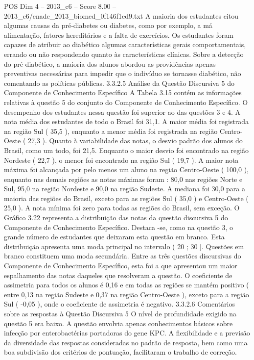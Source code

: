 \begin{textsample}{POS Dim 4 – 2013\_c6 – Score 8.00 – 2013\_c6/enade\_2013\_biomed\_0f146f1ed9.txt}
A maioria dos estudantes citou algumas causas da pré-diabetes ou diabetes, como por exemplo, a má alimentação, fatores hereditários e a falta de exercícios.
Os estudantes foram capazes de atribuir ao diabético algumas características gerais comportamentais, errando ou não respondendo quanto às características clínicas.
Sobre a detecção do pré-diabético, a maioria dos alunos abordou as providências apenas preventivas necessárias para impedir que o indivíduo se tornasse diabético, não comentando as políticas públicas. 3.3.2.5 Análise da Questão Discursiva 5 do Componente de Conhecimento Específico A Tabela 3.15 contém as informações relativas à questão 5 do conjunto do Componente de Conhecimento Específico.
O desempenho dos estudantes nessa questão foi superior ao das questões 3 e 4.
A nota média dos estudantes de todo o Brasil foi 31,1.
A maior média foi registrada na região Sul ( 35,5 ), enquanto a menor média foi registrada na região Centro-Oeste ( 27,3 ).
Quanto à variabilidade das notas, o desvio padrão dos alunos do Brasil, como um todo, foi 21,5.
Enquanto o maior desvio foi encontrado na região Nordeste ( 22,7 ), o menor foi encontrado na região Sul ( 19,7 ).
A maior nota máxima foi alcançada por pelo menos um aluno na região Centro-Oeste ( 100,0 ), enquanto nas demais regiões as notas máximas foram : 80,0 nas regiões Norte e Sul, 95,0 na região Nordeste e 90,0 na região Sudeste.
A mediana foi 30,0 para a maioria das regiões do Brasil, exceto para as regiões Sul ( 35,0 ) e Centro-Oeste ( 25,0 ).
A nota mínima foi zero para todas as regiões do Brasil, sem exceção.
O Gráfico 3.22 representa a distribuição das notas da questão discursiva 5 do Componente de Conhecimento Específico.
Destaca -se, como na questão 3, o grande número de estudantes que deixaram esta questão em branco.
Esta distribuição apresenta uma moda principal no intervalo ( 20 ; 30 ].
Questões em branco constituem uma moda secundária.
Entre as três questões discursivas do Componente de Conhecimento Específico, esta foi a que apresentou um maior espalhamento das notas daqueles que resolveram a questão.
O coeficiente de assimetria para todos os alunos é 0,16 e em todas as regiões se mantém positivo ( entre 0,13 na região Sudeste e 0,37 na região Centro-Oeste ), exceto para a região Sul ( -0,05 ), onde o coeficiente de assimetria é negativo. 3.3.2.6 Comentários sobre as respostas à Questão Discursiva 5 O nível de profundidade exigido na questão 5 era baixo.
A questão envolvia apenas conhecimentos básicos sobre infecção por enterobactérias portadoras do gene KPC.
A flexibilidade e a previsão da diversidade das respostas consideradas no padrão de resposta, bem como uma boa subdivisão dos critérios de pontuação, facilitaram o trabalho de correção.

\end{textsample}
